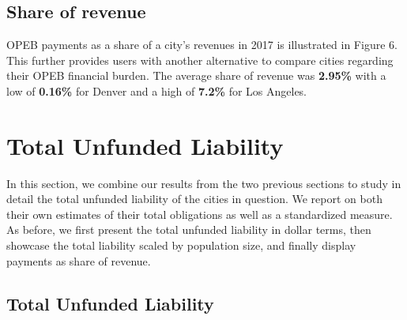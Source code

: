 \documentclass[12pt]{article}
\begin{document}
\subsection{Share of revenue}

OPEB payments as a share of a city's revenues in 2017 is illustrated in Figure 6. This further provides users
with another alternative to compare cities regarding their OPEB
financial burden. The average share of revenue was \textbf{2.95\%} with
a low of \textbf{0.16\%} for Denver and a high of \textbf{7.2\%} for Los
Angeles. 

\begin{figure}
  \label{fig:key}
\end{figure}


\section{Total Unfunded Liability}

In this section, we combine our results from the two previous sections
to study in detail the total unfunded liability of the cities in
question. We report on both their own estimates of their total
obligations as well as a standardized measure. As before, we first
present the total unfunded liability in dollar terms, then showcase the
total liability scaled by population size, and finally display payments
as share of revenue.


\subsection{Total Unfunded Liability}
\end{document}
